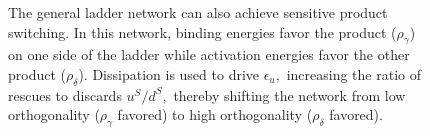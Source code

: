 \begin{figure}[htbp]
\subfigure{
\resizebox{1\columnwidth}{!}{
 
}}
\caption{The general ladder network can also achieve sensitive product switching.  In this network, binding energies favor the product ($\rho_\gamma$) on one side of the ladder while activation energies favor the other product ($\rho_\delta$).  Dissipation is used to drive $\epsilon_u,$ increasing the ratio of rescues to discards $u^S/d^S,$ thereby shifting the network from low orthogonality ($\rho_\gamma$ favored) to high orthogonality ($\rho_\delta$ favored). \label{fig:ladder_switch}}
\end{figure}